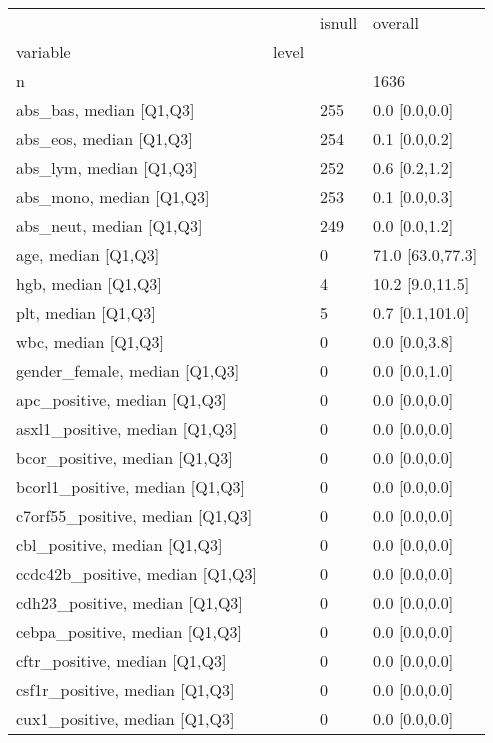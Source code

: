 \begin{tabular}{llll}
\toprule
                 &     & isnull &           overall \\
variable & level &        &                   \\
\midrule
n &     &        &              1636 \\
abs\_bas, median [Q1,Q3] &     &    255 &     0.0 [0.0,0.0] \\
abs\_eos, median [Q1,Q3] &     &    254 &     0.1 [0.0,0.2] \\
abs\_lym, median [Q1,Q3] &     &    252 &     0.6 [0.2,1.2] \\
abs\_mono, median [Q1,Q3] &     &    253 &     0.1 [0.0,0.3] \\
abs\_neut, median [Q1,Q3] &     &    249 &     0.0 [0.0,1.2] \\
age, median [Q1,Q3] &     &      0 &  71.0 [63.0,77.3] \\
hgb, median [Q1,Q3] &     &      4 &   10.2 [9.0,11.5] \\
plt, median [Q1,Q3] &     &      5 &   0.7 [0.1,101.0] \\
wbc, median [Q1,Q3] &     &      0 &     0.0 [0.0,3.8] \\
gender\_female, median [Q1,Q3] &     &      0 &     0.0 [0.0,1.0] \\
apc\_positive, median [Q1,Q3] &     &      0 &     0.0 [0.0,0.0] \\
asxl1\_positive, median [Q1,Q3] &     &      0 &     0.0 [0.0,0.0] \\
bcor\_positive, median [Q1,Q3] &     &      0 &     0.0 [0.0,0.0] \\
bcorl1\_positive, median [Q1,Q3] &     &      0 &     0.0 [0.0,0.0] \\
c7orf55\_positive, median [Q1,Q3] &     &      0 &     0.0 [0.0,0.0] \\
cbl\_positive, median [Q1,Q3] &     &      0 &     0.0 [0.0,0.0] \\
ccdc42b\_positive, median [Q1,Q3] &     &      0 &     0.0 [0.0,0.0] \\
cdh23\_positive, median [Q1,Q3] &     &      0 &     0.0 [0.0,0.0] \\
cebpa\_positive, median [Q1,Q3] &     &      0 &     0.0 [0.0,0.0] \\
cftr\_positive, median [Q1,Q3] &     &      0 &     0.0 [0.0,0.0] \\
csf1r\_positive, median [Q1,Q3] &     &      0 &     0.0 [0.0,0.0] \\
cux1\_positive, median [Q1,Q3] &     &      0 &     0.0 [0.0,0.0] \\

\end{tabular}
